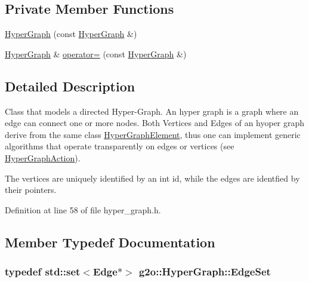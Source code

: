 \subsection*{Private Member Functions}
\begin{DoxyCompactItemize}
\item 
\hyperlink{classg2o_1_1HyperGraph_ab19a6e0681e2b30d48740cebf553c7eb}{Hyper\+Graph} (const \hyperlink{classg2o_1_1HyperGraph}{Hyper\+Graph} \&)
\item 
\hyperlink{classg2o_1_1HyperGraph}{Hyper\+Graph} \& \hyperlink{classg2o_1_1HyperGraph_aace0adc6b03e56bf6b554368d49dcf88}{operator=} (const \hyperlink{classg2o_1_1HyperGraph}{Hyper\+Graph} \&)
\end{DoxyCompactItemize}


\subsection{Detailed Description}
Class that models a directed Hyper-\/\+Graph. An hyper graph is a graph where an edge can connect one or more nodes. Both Vertices and Edges of an hyoper graph derive from the same class \hyperlink{structg2o_1_1HyperGraph_1_1HyperGraphElement}{Hyper\+Graph\+Element}, thus one can implement generic algorithms that operate transparently on edges or vertices (see \hyperlink{classg2o_1_1HyperGraphAction}{Hyper\+Graph\+Action}).

The vertices are uniquely identified by an int id, while the edges are identfied by their pointers. 

Definition at line 58 of file hyper\+\_\+graph.\+h.



\subsection{Member Typedef Documentation}
\subsubsection[{\texorpdfstring{Edge\+Set}{EdgeSet}}]{\setlength{\rightskip}{0pt plus 5cm}typedef std\+::set$<${\bf Edge}$\ast$$>$ {\bf g2o\+::\+Hyper\+Graph\+::\+Edge\+Set}}\hypertarget{classg2o_1_1HyperGraph_a5e2970e236c0dcb4eff7c205d7b6b4ae}{}\label{classg2o_1_1HyperGraph_a5e2970e236c0dcb4eff7c205d7b6b4ae}


